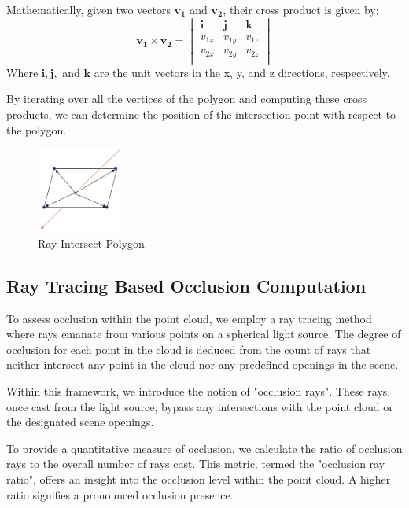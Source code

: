 \documentclass[11pt, a4paper,oneside,chapterprefix=false]{scrbook}
\begin{document}
Mathematically, given two vectors \( \mathbf{v_1} \) and \( \mathbf{v_2} \), their cross product is given by:
\[
\mathbf{v_1} \times \mathbf{v_2} = \begin{vmatrix}
\mathbf{i} & \mathbf{j} & \mathbf{k} \\
v_{1x} & v_{1y} & v_{1z} \\
v_{2x} & v_{2y} & v_{2z} \\
\end{vmatrix}
\]
Where \( \mathbf{i}, \mathbf{j}, \) and \( \mathbf{k} \) are the unit vectors in the x, y, and z directions, respectively.

By iterating over all the vertices of the polygon and computing these cross products, we can determine the position of the intersection point with respect to the polygon.

\begin{minipage}{\textwidth}
	\begin{figure}[H]
		\centering
		\includegraphics*[width=0.25\textwidth]{figures/intersect polygon.png}
		\caption{Ray Intersect Polygon}
		\label{fig:ray intersect polygon}
	\end{figure}
\end{minipage}


\subsection{Ray Tracing Based Occlusion Computation} \label{sec:ray tracing occlusion computation}

To assess occlusion within the point cloud, we employ a ray tracing method where rays emanate from various points on a spherical light source. The degree of occlusion for each point in the cloud is deduced from the count of rays that neither intersect any point in the cloud nor any predefined openings in the scene.

Within this framework, we introduce the notion of "occlusion rays". These rays, once cast from the light source, bypass any intersections with the point cloud or the designated scene openings.

To provide a quantitative measure of occlusion, we calculate the ratio of occlusion rays to the overall number of rays cast. This metric, termed the "occlusion ray ratio", offers an insight into the occlusion level within the point cloud. A higher ratio signifies a pronounced occlusion presence.
\end{document}
